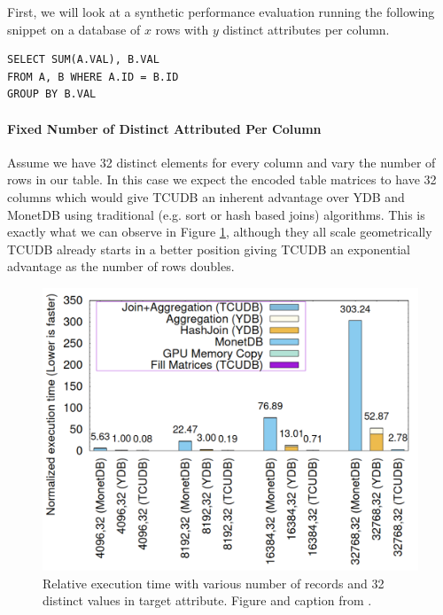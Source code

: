 \documentclass{paper}
\begin{document}
	First, we will look at a synthetic performance evaluation running the following snippet on a database of $x$ rows with $y$ distinct attributes per column.
	\begin{verbatim}
SELECT SUM(A.VAL), B.VAL
FROM A, B WHERE A.ID = B.ID
GROUP BY B.VAL
	\end{verbatim}

\paragraph{Fixed Number of Distinct Attributed Per Column}
Assume we have 32 distinct elements for every column and vary the number of rows in our table.
	In this case we expect the encoded table matrices to have 32 columns which would give TCUDB an inherent advantage over YDB and MonetDB using traditional (e.g. sort or hash based joins) algorithms. This is exactly what we can observe in Figure \ref{fig:bench1}, although they all scale geometrically TCUDB already starts in a better position giving TCUDB an exponential advantage as the number of rows doubles. 
	\begin{figure}
		\centering
		\includegraphics[width=0.9\linewidth]{bench1}
		\caption{Relative execution time with various number of records and 32 distinct values in target attribute. Figure and caption from \cite{hu2021tcudb}.}
		\label{fig:bench1}
	\end{figure}
	
\end{document}
